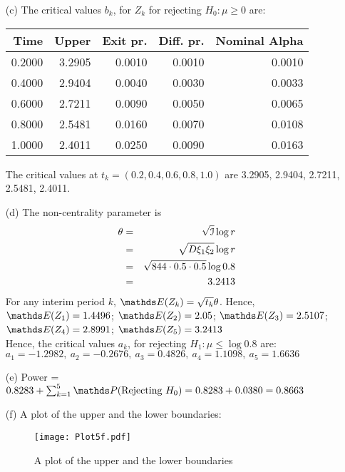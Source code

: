 \documentclass[11pt,a4paper]{article}
\begin{document}
\begin{enumerate}
\begin{enumerate}
\item[(c)] The critical values $b_k$, for $Z_k$ for rejecting $H_0: \mu \geq 0$ are:
\begin{table}[H]
\centering
\begin{tabular}{rrrrr}
  \hline
  Time &  Upper & Exit pr. & Diff. pr. & Nominal Alpha \\ 
  \hline
  0.2000 & 3.2905 & 0.0010 & 0.0010 & 0.0010 \\ 
  0.4000 & 2.9404 & 0.0040 & 0.0030 & 0.0033 \\ 
  0.6000 & 2.7211 & 0.0090 & 0.0050 & 0.0065 \\ 
  0.8000 & 2.5481 & 0.0160 & 0.0070 & 0.0108 \\ 
  1.0000 & 2.4011 & 0.0250 & 0.0090 & 0.0163 \\ 
  \hline
\end{tabular}
\end{table}
The critical values at $t_k = (0.2, 0.4, 0.6, 0.8, 1.0)$ are 3.2905, 2.9404, 2.7211, 2.5481, 2.4011.

\item[(d)] The non-centrality parameter is
\begin{eqnarray*}
 \theta & = & \sqrt{\mathcal{I}}\log r \\
        & = & \sqrt{D \xi_1 \xi_2} \log r \\
        & = & \sqrt{844 \cdot 0.5 \cdot 0.5 } \log 0.8 \\
        & = & 3.2413
\end{eqnarray*}
For any interim period $k$, $\Exp(Z_k) = \sqrt{t_k}\theta$. Hence,\\
$\Exp(Z_1) = 1.4496$; 
$\Exp(Z_2) = 2.05$; 
$\Exp(Z_3) = 2.5107$; 
$\Exp(Z_4) = 2.8991$; 
$\Exp(Z_5) = 3.2413$ \\
Hence, the critical values $a_k$, for rejecting $H_1: \mu \leq \log 0.8$ are:\\
$a_1 = -1.2982,\ a_2 = -0.2676,\ a_3 = 0.4826,\ a_4 = 1.1098,\ a_5 = 1.6636$     

\item[(e)] Power = $0.8283 + \sum_{k = 1}^5 \Prob(\text{Rejecting } H_0) = 0.8283 + 0.0380 = 0.8663$

\item[(f)] A plot of the upper and the lower boundaries:
\begin{figure}[H]
\begin{center}
\texttt{[image: Plot5f.pdf]}
\end{center}
\caption{A plot of the upper and the lower boundaries}
\end{figure}


\end{enumerate}
\end{enumerate}
\end{document}
